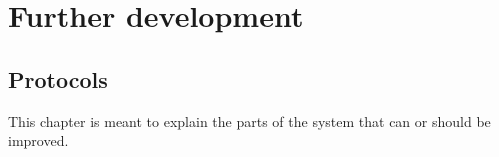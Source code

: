 
\chapter{Further development}

\section{Protocols}

This chapter is meant to explain the parts of the system that can or should be improved. 